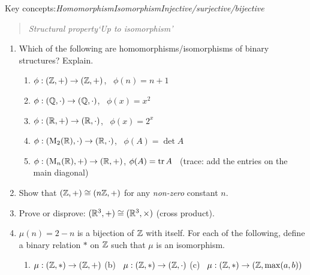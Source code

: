 \begin{exercises}{}
	Key concepts:\quad \emph{Homomorphism\quad Isomorphism\quad Injective/surjective/bijective}
	\begin{quote}
		\emph{Structural property\quad `Up to isomorphism'}
	\end{quote}
	
	\begin{enumerate}	  
		\item Which of the following are homomorphisms/isomorphisms of binary structures? Explain.
	  \begin{enumerate}
	    \item {}
	    $\phi:(\mathbb{Z},+)\to (\mathbb{Z},+)$, \ $\phi(n)=n+1$
	    \setcounter{enumii}{2}
	    
	    \item {}
	    $\phi:(\mathbb{Q},\cdot)\to (\mathbb{Q},\cdot)$, \ $\phi(x)=x^2$
	    \setcounter{enumii}{4}
	    
	    \item {}
	    $\phi:(\mathbb{R},+)\to (\mathbb{R},\cdot)$, \ $\phi(x)=2^x$
	    \setcounter{enumii}{6}
	    
	    \item %
	    $\phi:(\mathrm{M}_2(\mathbb{R}),\cdot)\to (\mathbb{R},\cdot)$, \ $\phi(A)=\det A$
	    
	    \item $\phi:(\mathrm{M}_n(\mathbb{R}),+)\to (\mathbb{R},+)$, $\phi(A)=\operatorname{tr} A$ \ (trace: add the entries on the main diagonal)
	  \end{enumerate}
	  
	  
	  \item Show that $(\mathbb{Z},+)\cong (n\mathbb{Z},+)$ for any \emph{non-zero} constant $n$.
	  
	  
	  
	  
	  \item Prove or disprove: $(\mathbb{R}^3,+)\cong(\mathbb{R}^3,\times)$ (cross product). 
	  
	  
	  \item $\mu(n)=2-n$ is a bijection of $\mathbb{Z}$ with itself. For each of the following, define a binary relation $*$ on $\mathbb{Z}$ such that $\mu$ is an isomorphism.
	  \begin{enumerate}
	    \item $\mu:(\mathbb{Z},*)\to (\mathbb{Z},+)$\quad\qquad
	    (b) \ $\mu:(\mathbb{Z},*)\to (\mathbb{Z},\cdot)$\quad\qquad 
	    (c) \ $\mu:(\mathbb{Z},*)\to (\mathbb{Z},\max(a,b))$
	  \end{enumerate}


\end{enumerate}
\end{exercises}

